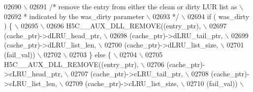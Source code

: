 \begin{DoxyCode}
02690 \textcolor{preprocessor}{                                                                             \(\backslash\)}
02691 \textcolor{preprocessor}{            }\textcolor{comment}{/* remove the entry from either the clean or dirty LUR list as   \(\backslash\)}
02692 \textcolor{comment}{             * indicated by the was\_dirty parameter                          \(\backslash\)}
02693 \textcolor{comment}{             */}\textcolor{preprocessor}{                                                              \(\backslash\)}
02694 \textcolor{preprocessor}{            if ( was\_dirty ) \{                                               \(\backslash\)}
02695 \textcolor{preprocessor}{                                                                             \(\backslash\)}
02696 \textcolor{preprocessor}{                H5C\_\_AUX\_DLL\_REMOVE((entry\_ptr),                             \(\backslash\)}
02697 \textcolor{preprocessor}{                     (cache\_ptr)->dLRU\_head\_ptr,             \(\backslash\)}
02698 \textcolor{preprocessor}{                                     (cache\_ptr)->dLRU\_tail\_ptr,             \(\backslash\)}
02699 \textcolor{preprocessor}{                                     (cache\_ptr)->dLRU\_list\_len,             \(\backslash\)}
02700 \textcolor{preprocessor}{                                     (cache\_ptr)->dLRU\_list\_size,            \(\backslash\)}
02701 \textcolor{preprocessor}{                     (fail\_val))                             \(\backslash\)}
02702 \textcolor{preprocessor}{                                                                             \(\backslash\)}
02703 \textcolor{preprocessor}{            \} else \{                                                         \(\backslash\)}
02704 \textcolor{preprocessor}{                                                                             \(\backslash\)}
02705 \textcolor{preprocessor}{                H5C\_\_AUX\_DLL\_REMOVE((entry\_ptr),                             \(\backslash\)}
02706 \textcolor{preprocessor}{                     (cache\_ptr)->cLRU\_head\_ptr,             \(\backslash\)}
02707 \textcolor{preprocessor}{                                     (cache\_ptr)->cLRU\_tail\_ptr,             \(\backslash\)}
02708 \textcolor{preprocessor}{                                     (cache\_ptr)->cLRU\_list\_len,             \(\backslash\)}
02709 \textcolor{preprocessor}{                                     (cache\_ptr)->cLRU\_list\_size,            \(\backslash\)}
02710 \textcolor{preprocessor}{                     (fail\_val))                             \(\backslash\)}

\end{DoxyCode}
